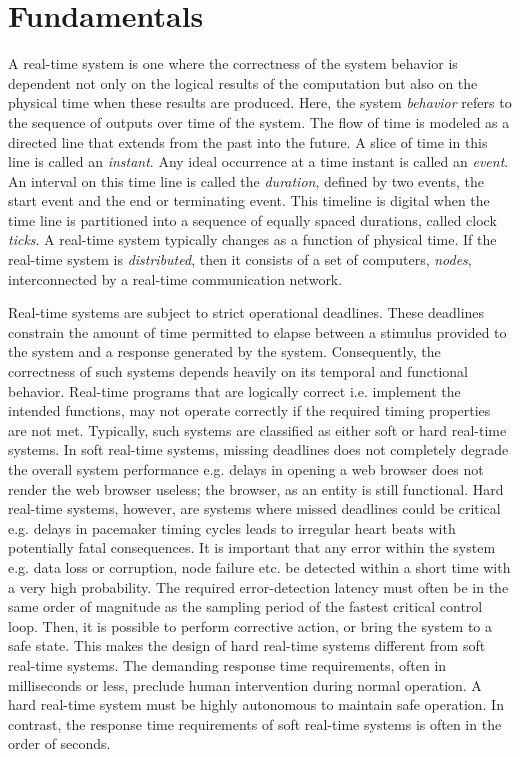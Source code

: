 \chapter{Fundamentals}
\label{chapter:fundamentals}

A real-time system \cite{liu2000real} is one where the correctness of the system behavior is dependent not only on the logical results of the computation but also on the physical time when these results are produced. Here, the system \emph{behavior} refers to the sequence of outputs over time of the system. The flow of time is modeled as a directed line that extends from the past into the future. A slice of time in this line is called an \emph{instant}. Any ideal occurrence at a time instant is called an \emph{event}. An interval on this time line is called the \emph{duration}, defined by two events, the start event and the end or terminating event. This timeline is digital when the time line is partitioned into a sequence of equally spaced durations, called clock \emph{ticks}. A real-time system typically changes as a function of physical time. If the real-time system is \emph{distributed}, then it consists of a set of computers, \emph{nodes}, interconnected by a real-time communication network.

Real-time systems are subject to strict operational deadlines. These deadlines constrain the amount of time permitted to elapse between a stimulus provided to the system and a response generated by the system. Consequently, the correctness of such systems depends heavily on its temporal and functional behavior. Real-time programs that are logically correct i.e. implement the intended functions, may not operate correctly if the required timing properties are not met. Typically, such systems are classified as either soft or hard real-time systems. In soft real-time systems, missing deadlines does not completely degrade the overall system performance e.g. delays in opening a web browser does not render the web browser useless; the browser, as an entity is still functional. Hard real-time systems, however, are systems where missed deadlines could be critical e.g. delays in pacemaker timing cycles leads to irregular heart beats with potentially fatal consequences. It is important that any error within the system e.g. data loss or corruption, node failure etc. be detected within a short time with a very high probability. The required error-detection latency must often be in the same order of magnitude as the sampling period of the fastest critical control loop. Then, it is possible to perform corrective action, or bring the system to a safe state. This makes the design of hard real-time systems different from soft real-time systems. The demanding response time requirements, often in milliseconds or less, preclude human intervention during normal operation. A hard real-time system must be highly autonomous to maintain safe operation. In contrast, the response time requirements of soft real-time systems is often in the order of seconds. 

